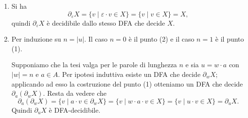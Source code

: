 \begin{sol}
\begin{enumerate}
Per ogni $v\in A^*$ vale
\[
T'^*(q_0',v)=T^*(q_0',v)=T^*(T(q_0,a),v)=T^*(q_0,av),
\]
quindi $\mathcal A_a$ accetta $v$ se e solo se $T^*(q_0,av)\in F$, cioè se e solo se $av\in X$, ovvero $v\in\partial_aX$. Dunque $\mathcal A_a$ decide $\partial_aX$.

\item Si ha
\[
\partial_\varepsilon X=\{v\mid \varepsilon\cdot v\in X\}=\{v\mid v\in X\}=X,
\]
quindi $\partial_\varepsilon X$ è decidibile dallo stesso DFA che decide $X$.

\item Per induzione su $n=|u|$. Il caso $n=0$ è il punto (2) e il caso $n=1$ è il punto (1).

Supponiamo che la tesi valga per le parole di lunghezza $n$ e sia $u=w\cdot a$ con $|w|=n$ e $a\in A$. Per ipotesi induttiva esiste un DFA che decide $\partial_wX$; applicando ad esso la costruzione del punto (1) otteniamo un DFA che decide $\partial_a(\partial_wX)$. Resta da vedere che
\[
\partial_a(\partial_wX)=\{v\mid a\cdot v\in\partial_wX\}=\{v\mid w\cdot a\cdot v\in X\}=\{v\mid u\cdot v\in X\}=\partial_uX.
\]
Quindi $\partial_uX$ è DFA-decidibile.
\end{enumerate}
\end{sol}

\newpage

